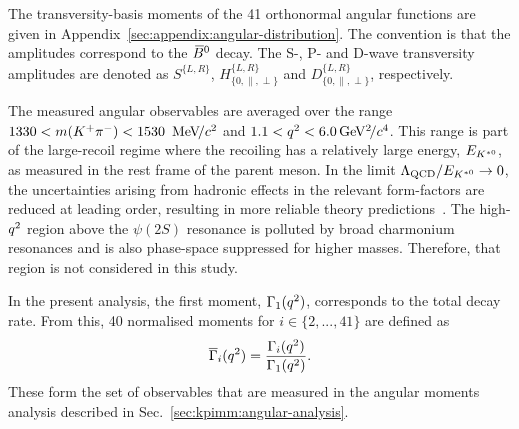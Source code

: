 The transversity-basis moments of the 41 orthonormal angular functions are given in Appendix~\ref{sec:appendix:angular-distribution}. The convention is that the amplitudes correspond to the ${{\kern 0.18em\overline{\kern -0.18em B}{}}{}^0}$ decay. The S-, P- and D-wave transversity amplitudes are denoted as $S^{\{L,R\}}$, $H^{\{L,R\}}_{\{0,\parallel,\perp\}}$ and $D^{\{L,R\}}_{\{0,\parallel,\perp\}}$, respectively. 

The measured angular observables are averaged over the range $1330<m({{K}^+}{{\pi}^-})<1530~{\mathrm{\,Me\kern -0.1em V\!/}c^2}$ and $1.1<{q^2}<6.0{\mathrm{\,Ge\kern -0.1em V^2\!/}c^4}$. This \qsq range is part of the large-recoil regime where the recoiling \Kstarz has a relatively large energy, $E_{{{K}^{*0}}}$, as measured in the rest frame of the parent \B meson. In the limit $\Lambda_{\rm QCD}/E_{{{K}^{*0}}} \rightarrow 0$, the uncertainties arising from hadronic effects in the relevant form-factors are reduced at leading order, resulting in more reliable theory predictions~\cite{DescotesGenon:2013wba}. The high-${q^2}$ region above the $\psi(2S)$ resonance is polluted by broad charmonium resonances and is also phase-space suppressed for higher \mkpi masses. Therefore, that region is not considered in this study.

In the present analysis, the first moment, $\Gamma_{1}({q^2})$, corresponds to the total decay rate. From this, 40 normalised moments for $i \in \{2,...,41\}$ are defined as
\begin{equation}
\label{eqn:norm_mom_def}
\overline{\Gamma}_i({q^2}) = \frac{\Gamma_{i}({q^2})}{\Gamma_{1}({q^2})}.
\end{equation}
\noindent These form the set of observables that are measured in the angular moments analysis described in Sec.~\ref{sec:kpimm:angular-analysis}.
